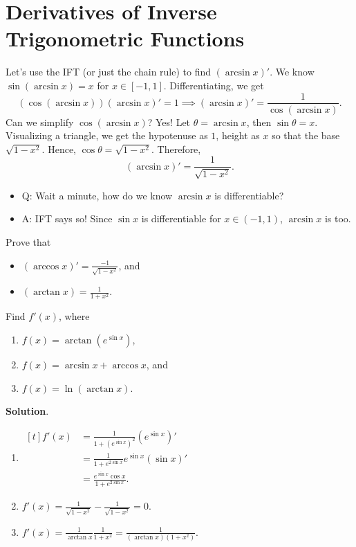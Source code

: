 \section{Derivatives of Inverse Trigonometric Functions} %
Let's use the IFT (or just the chain rule) to find $ (\arcsin x)' $. We know $ \sin(\arcsin x)=x $ for $ x\in[-1,1] $.
Differentiating, we get
\[ (\cos(\arcsin x))(\arcsin x)'=1\implies (\arcsin x)'=\frac{1}{\cos(\arcsin x)}. \]
Can we simplify $ \cos(\arcsin x) $? Yes! Let $ \theta=\arcsin x $, then $ \sin \theta=x $.
Visualizing a triangle, we get the hypotenuse as $ 1 $, height as $ x $ so that the base $ \sqrt{1-x^2} $. Hence,
$ \cos \theta=\sqrt{1-x^2} $. Therefore,
\[ (\arcsin x)'=\frac{1}{\sqrt{1-x^2}}. \]
\begin{itemize}
    \item Q\@: Wait a minute, how do we know $ \arcsin x $ is differentiable?
    \item A\@: IFT says so! Since $ \sin x $ is differentiable for $ x\in(-1,1) $, $ \arcsin x $ is too.
\end{itemize}
\begin{Exercise}{}{}
    Prove that
    \begin{itemize}
        \item $ \displaystyle (\arccos x)'=\frac{-1}{\sqrt{1-x^2}} $, and
        \item $ \displaystyle (\arctan x)=\frac{1}{1+x^2} $.
    \end{itemize}
\end{Exercise}
\begin{Example}{}{}
    Find $ f'(x) $, where
    \begin{enumerate}
        \item $ f(x)=\arctan(e^{\sin x}) $,
        \item $ f(x)=\arcsin x+\arccos x $, and
        \item $ f(x)=\ln(\arctan x) $.
    \end{enumerate}
    \tcblower{}
    \textbf{Solution}.
    \begin{enumerate}
        \item $ \begin{aligned}[t]
                      f'(x)
                       & =\frac{1}{1+(e^{\sin x})^2}(e^{\sin x})'    \\
                       & =\frac{1}{1+e^{2\sin x}}e^{\sin x}(\sin x)' \\
                       & =\frac{e^{\sin x}\cos x}{1+e^{2\sin x}}.
                  \end{aligned} $
        \item $ f'(x)=\frac{1}{\sqrt{1-x^2}}-\frac{1}{\sqrt{1-x^2}}=0 $.
        \item $ f'(x)=\frac{1}{\arctan x}\frac{1}{1+x^2}=\frac{1}{(\arctan x)(1+x^2)} $.
    \end{enumerate}
\end{Example}